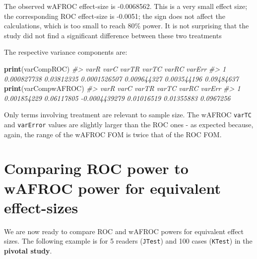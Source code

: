 \documentclass[]{book}
\newenvironment{Shaded}{\begin{snugshade}}{\end{snugshade}}
\newcommand{\CommentTok}[1]{\textcolor[rgb]{0.56,0.35,0.01}{\textit{#1}}}
\newcommand{\KeywordTok}[1]{\textcolor[rgb]{0.13,0.29,0.53}{\textbf{#1}}}
\newcommand{\NormalTok}[1]{#1}
\begin{document}
The observed wAFROC effect-size is -0.0068562. This is a very small effect size; the corresponding ROC effect-size is -0.0051; the sign does not affect the calculations, which is too small to reach 80\% power. It is not surprising that the study \citep{RN1882} did not find a significant difference between these two treatments

The respective variance components are:

\begin{Shaded}
\begin{Highlighting}[]
\KeywordTok{print}\NormalTok{(varCompROC)}
\CommentTok{#>          varR       varC        varTR       varTC       varRC     varErr}
\CommentTok{#> 1 0.000827738 0.03812335 0.0001526507 0.009644327 0.003544196 0.09484637}
\KeywordTok{print}\NormalTok{(varCompwAFROC)}
\CommentTok{#>          varR       varC         varTR      varTC      varRC    varErr}
\CommentTok{#> 1 0.001854229 0.06117805 -0.0004439279 0.01016519 0.01355883 0.0967256}
\end{Highlighting}
\end{Shaded}

Only terms involving treatment are relevant to sample size. The wAFROC \texttt{varTC} and \texttt{varError} values are slightly larger than the ROC ones - as expected because, again, the range of the wAFROC FOM is twice that of the ROC FOM.

\hypertarget{comparing-roc-power-to-wafroc-power-for-equivalent-effect-sizes}{%
\section{Comparing ROC power to wAFROC power for equivalent effect-sizes}\label{comparing-roc-power-to-wafroc-power-for-equivalent-effect-sizes}}

We are now ready to compare ROC and wAFROC powers for equivalent effect sizes. The following example is for 5 readers (\texttt{JTest}) and 100 cases (\texttt{KTest}) in the \textbf{pivotal study}.
\end{document}
